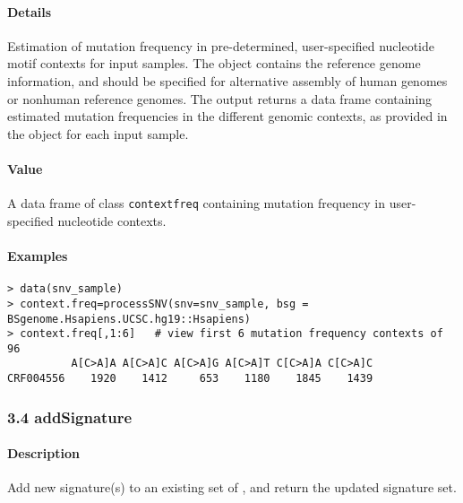 \documentclass[]{article}
\let\oldparagraph\paragraph
\renewcommand{\paragraph}[1]{\oldparagraph{#1}\mbox{}}
\begin{document}
\paragraph{\texorpdfstring{\textbf{Details}}{Details}}\label{details-2}

Estimation of mutation frequency in pre-determined, user-specified
nucleotide motif contexts for input samples. The  object
contains the reference genome information, and should be specified for
alternative assembly of human genomes or nonhuman reference genomes. The
output returns a data frame containing estimated mutation frequencies in
the different genomic contexts, as provided in the 
object for each input sample.

\hypertarget{contextfreq}{\paragraph{\texorpdfstring{\textbf{Value}}{Value}}\label{contextfreq}}

A data frame of class \texttt{contextfreq} containing mutation frequency
in user-specified nucleotide contexts.

\paragraph{\texorpdfstring{\textbf{Examples}}{Examples}}\label{examples-2}

\begin{verbatim}
> data(snv_sample)
> context.freq=processSNV(snv=snv_sample, bsg = BSgenome.Hsapiens.UCSC.hg19::Hsapiens)
> context.freq[,1:6]   # view first 6 mutation frequency contexts of 96
          A[C>A]A A[C>A]C A[C>A]G A[C>A]T C[C>A]A C[C>A]C
CRF004556    1920    1412     653    1180    1845    1439
\end{verbatim}

\subsubsection{3.4 addSignature}\label{addsignature}

\paragraph{\texorpdfstring{\textbf{Description}}{Description}}\label{description-3}

Add new signature(s) to an existing set of , and
return the updated signature set.
\end{document}
